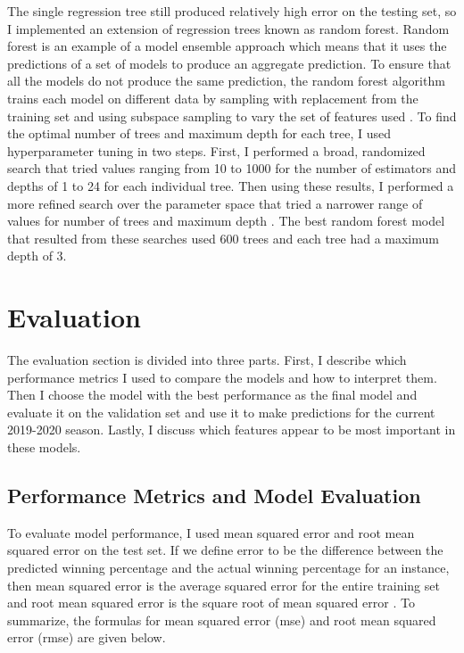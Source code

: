 \documentclass[pageno]{jpaper}
\begin{document}
The single regression tree still produced relatively high error on the testing set, so I implemented an extension of regression trees known as random forest. Random forest is an example of a model ensemble approach which means that it uses the predictions of a set of models to produce an aggregate prediction. To ensure that all the models do not produce the same prediction, the random forest algorithm trains each model on different data by sampling with replacement from the training set and using subspace sampling to vary the set of features used \cite{mitfundamentals}. To find the optimal number of trees and maximum depth for each tree, I used hyperparameter tuning in two steps. First, I performed a broad, randomized search that tried values ranging from 10 to 1000 for the number of estimators and depths of 1 to 24 for each individual tree. Then using these results, I performed a more refined search over the parameter space that tried a narrower range of values for number of trees and maximum depth \cite{hyperparam}. The best random forest model that resulted from these searches used 600 trees and each tree had a maximum depth of 3.

\section{Evaluation}

The evaluation section is divided into three parts. First, I describe which performance metrics I used to compare the models and how to interpret them. Then I choose the model with the best performance as the final model and evaluate it on the validation set and use it to make predictions for the current 2019-2020 season. Lastly, I discuss which features appear to be most important in these models.

\subsection{Performance Metrics and Model Evaluation}

To evaluate model performance, I used mean squared error and root mean squared error on the test set. If we define error to be the difference between the predicted winning percentage and the actual winning percentage for an instance,
then mean squared error is the average squared error for the entire training set and root mean squared error is the square root of mean squared error \cite{mitfundamentals}. To summarize, the formulas for mean squared error (mse) and root mean squared error (rmse) are given below.
\end{document}
